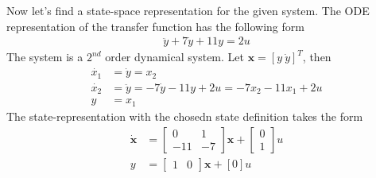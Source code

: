\documentclass[twoside]{article}
\theoremstyle{definition}
\begin{document}
\vspace{12pt}

Now let's find a state-space representation for the given system. The
ODE representation of the transfer function has the following form
%
\begin{align*}
  \ddot{y} + 7 \dot{y} + 11 y = 2 u
\end{align*}
%
The system is a $2^{nd}$ order dynamical system. Let $\mathbf{x} = [y
\ \dot{y}]^T$, then 
%
\begin{align*}
  \dot{x_1} &= \dot{y} = x_2 \\
  \dot{x_2} &= \ddot{y} = -7 \dot{y} - 11 y + 2 u  
              = -7 x_2 - 11 x_1 +2 u  \\
  y &= x_1
\end{align*}
%
The state-representation with the chosedn state definition takes the form
 \begin{align*}
\dot{\mathbf{x}} &= \left[ \begin{array}{cc} 0 & 1\\
-11 & -7 
\end{array} \right] \mathbf{x} +
\left[ \begin{array}{c} 0 \\ 1 \end{array} \right] u
\\
y &= \left[ \begin{array}{cccc} 1 & 0 \end{array} \right] \mathbf{x} 
+ [ 0 ] u
\end{align*}

\end{document}
